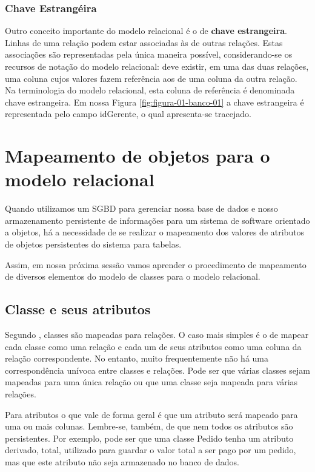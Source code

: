 \subsubsection{Chave Estrangéira}\label{subsub:chave-estrangeira}
Outro conceito importante do modelo relacional é o de \textbf{chave estrangeira}. Linhas de uma relação podem estar associadas às de outras relações. Estas associações são representadas pela única maneira possível, considerando-se os recursos de notação do modelo relacional: deve existir, em uma das duas relações, uma coluna cujos valores fazem referência aos de uma coluna da outra relação. Na terminologia do modelo relacional, esta coluna de referência é denominada chave estrangeira. Em nossa Figura \ref{fig:figura-01-banco-01} a chave estrangeira é representada pelo campo idGerente, o qual apresenta-se tracejado.

\section{Mapeamento de objetos para o modelo relacional} 

Quando utilizamos um SGBD para gerenciar nossa base de dados e nosso armazenamento persistente de informações para um sistema de software orientado a objetos, há a necessidade de se realizar o mapeamento dos valores de atributos de objetos persistentes do sistema para tabelas. 

Assim, em nossa próxima sessão vamos aprender o procedimento de mapeamento de diversos elementos do modelo de classes para o modelo relacional. 

\subsection{Classe e seus atributos}

Segundo , classes são mapeadas para relações. O caso mais simples é o de mapear cada classe como uma relação e cada um de seus atributos como uma coluna da relação correspondente. No entanto, muito frequentemente não há uma correspondência unívoca entre classes e relações. Pode ser que várias classes sejam mapeadas para uma única relação ou que uma classe seja mapeada para várias relações.

Para atributos o que vale de forma geral é que um atributo será mapeado para uma ou mais colunas. Lembre-se, também, de que nem todos os atributos são persistentes. Por exemplo, pode ser que uma classe Pedido tenha um atributo derivado, total, utilizado para guardar o valor total a ser pago por um pedido, mas que este atributo não seja armazenado no banco de dados.

